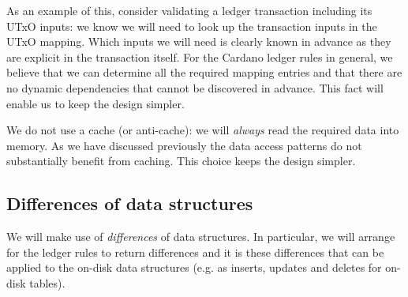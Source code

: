 \documentclass[11pt,a4paper]{article}
\begin{document}
As an example of this, consider validating a ledger transaction including its
UTxO inputs: we know we will need to look up the transaction inputs in the UTxO
mapping. Which inputs we will need is clearly known in advance as they are
explicit in the transaction itself. For the Cardano ledger rules in general, we
believe that we can determine all the required mapping entries and that there
are no dynamic dependencies that cannot be discovered in advance. This fact will
enable us to keep the design simpler.

We do not use a cache (or anti-cache): we will \emph{always} read the required
data into memory. As we have discussed previously \citep{utxo-db} the data
access patterns do not substantially benefit from caching. This choice keeps
the design simpler.

\subsection{Differences of data structures}
\label{differences-of-data-structures}

We will make use of \emph{differences} of data structures. In particular,
we will arrange for the ledger rules to return differences and it is these
differences that can be applied to the on-disk data structures (e.g. as inserts,
updates and deletes for on-disk tables).

\begin{center}
\end{center}
\end{document}
